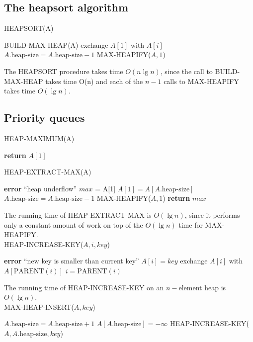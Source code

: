 \documentclass[12pt]{article}
\begin{document}
\subsection{The heapsort algorithm}

HEAPSORT(A)
\begin{algorithmic}[1]
\State BUILD-MAX-HEAP(A)
	\State exchange $A[1]$ with $A[i]$
        \State $A.\text{heap-size} = A.\text{heap-size} - 1$
	\State MAX-HEAPIFY($A, 1$)
\EndFor
\end{algorithmic}

The HEAPSORT procedure takes time $O(n \lg n)$, since the call to BUILD-MAX-HEAP takes time O(n) and each of the $n-1$ calls to MAX-HEAPIFY takes time $O(\lg n)$.

\subsection{Priority queues}

HEAP-MAXIMUM(A)
\begin{algorithmic}[1]
\State \textbf {return} $A[1]$
\end{algorithmic}

HEAP-EXTRACT-MAX(A)
\begin{algorithmic}[1]
	\State \textbf {error} ``heap underflow''
\EndIf
\State $max$ = A[1]
\State $A[1] = A[A.\text{heap-size}]$
\State $A.\text{heap-size} = A.\text{heap-size} - 1$
\State MAX-HEAPIFY($A,1$)
\State \textbf {return} $max$
\end{algorithmic}

The running time of HEAP-EXTRACT-MAX is $O(\lg n)$, since it performs only a constant amount of work on top of the $O(\lg n)$ time for MAX-HEAPIFY. \\

HEAP-INCREASE-KEY($A, i, key$)
\begin{algorithmic}[1]
	\State \textbf {error} ``new key is smaller than current key''
\EndIf
\State $A[i] = key$
	\State exchange $A[i]$ with $A[\text {PARENT}(i)]$
        \State $i = \text {PARENT}(i)$
\EndWhile
\end{algorithmic}

The running time of HEAP-INCREASE-KEY on an $n-$element heap is $O(\lg n)$. \\

MAX-HEAP-INSERT($A, key$)
\begin{algorithmic}[1]
\State $A.\text{heap-size} = A.\text{heap-size} + 1$
\State $A[A.\text{heap-size}] = -\infty$
\State HEAP-INCREASE-KEY($A, A.\text{heap-size},key$)
\end{algorithmic}
\end{document}

